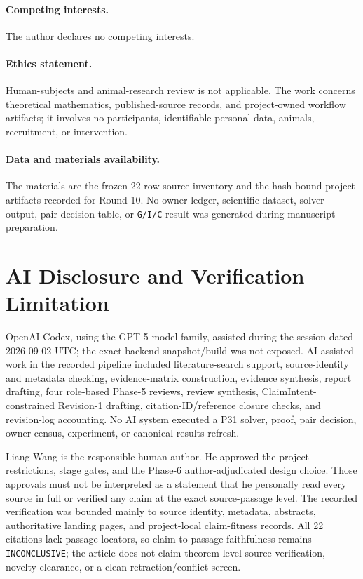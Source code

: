 \documentclass[11pt]{article}
\begin{document}
\paragraph{Competing interests.} The author declares no competing
interests.

\paragraph{Ethics statement.} Human-subjects and animal-research review
is not applicable. The work concerns theoretical mathematics,
published-source records, and project-owned workflow artifacts; it
involves no participants, identifiable personal data, animals,
recruitment, or intervention.

\paragraph{Data and materials availability.} The materials are the
frozen 22-row source inventory and the hash-bound project artifacts
recorded for Round 10. No owner ledger, scientific dataset, solver
output, pair-decision table, or \texttt{G/I/C} result was generated during
manuscript preparation.

\hypertarget{ai-disclosure-and-verification-limitation}{%
\section*{AI Disclosure and Verification
Limitation}\label{ai-disclosure-and-verification-limitation}}

OpenAI Codex, using the GPT-5 model family, assisted during the session
dated 2026-09-02 UTC; the exact backend snapshot/build was not exposed.
AI-assisted work in the recorded pipeline included literature-search
support, source-identity and metadata checking, evidence-matrix
construction, evidence synthesis, report drafting, four role-based
Phase-5 reviews, review synthesis, ClaimIntent-constrained Revision-1
drafting, citation-ID/reference closure checks, and revision-log
accounting. No AI system executed a P31 solver, proof, pair decision,
owner census, experiment, or canonical-results refresh.

Liang Wang is the responsible human author. He approved the project
restrictions, stage gates, and the Phase-6 author-adjudicated design
choice. Those approvals must not be interpreted as a statement that he
personally read every source in full or verified any claim at the exact
source-passage level. The recorded verification was bounded mainly to
source identity, metadata, abstracts, authoritative landing pages, and
project-local claim-fitness records. All 22 citations lack passage
locators, so claim-to-passage faithfulness remains
\texttt{INCONCLUSIVE}; the article does not claim theorem-level source
verification, novelty clearance, or a clean retraction/conflict screen.



\end{document}
